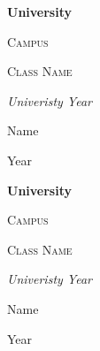 \documentclass{article}
\begin{document}
\begin{titlepage}
    \begin{titlepage}
    \centering
    {\bfseries\LARGE University \par}
    \vspace{1cm}
    {\scshape\Large Campus \par}
    \vspace{3cm}
    {\scshape\Huge Class Name \par}
    \vspace{3cm}
    {\itshape\Large Univeristy Year \par}
    \vfill
    {\Large Name \par}
    \vfill
    {\Large Year \par}
    \end{titlepage}
\end{titlepage}

\begin{titlepage}
    \begin{titlepage}
    \centering
    {\bfseries\LARGE University \par}
    \vspace{1cm}
    {\scshape\Large Campus \par}
    \vspace{3cm}
    {\scshape\Huge Class Name \par}
    \vspace{3cm}
    {\itshape\Large Univeristy Year \par}
    \vfill
    {\Large Name \par}
    \vfill
    {\Large Year \par}
    \end{titlepage}
\end{titlepage}
\end{document}
